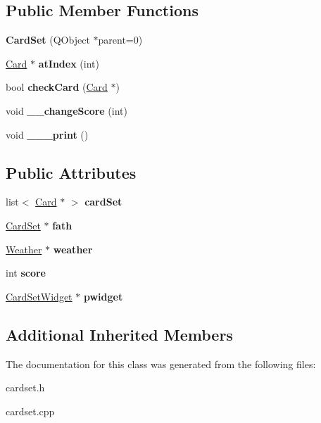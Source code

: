 \subsection*{Public Member Functions}
\begin{DoxyCompactItemize}
\item 
\mbox{\label{class_card_set_ab71f7d1a3ff84bbe38a15a9f3763cc51}} 
{\bfseries Card\+Set} (Q\+Object $\ast$parent=0)
\item 
\mbox{\label{class_card_set_aa1bc47338af30630e2bf531efbe0cf56}} 
\hyperlink{class_card}{Card} $\ast$ {\bfseries at\+Index} (int)
\item 
\mbox{\label{class_card_set_aaeac4f9e1a5560457653f42416721459}} 
bool {\bfseries check\+Card} (\hyperlink{class_card}{Card} $\ast$)
\item 
\mbox{\label{class_card_set_a5869ddf6190c03ce3bc5ce77139708e4}} 
void {\bfseries \+\_\+\+\_\+change\+Score} (int)
\item 
\mbox{\label{class_card_set_ab025d30be863978e10536c97874fbbe5}} 
void {\bfseries \+\_\+\+\_\+\+\_\+print} ()
\end{DoxyCompactItemize}
\subsection*{Public Attributes}
\begin{DoxyCompactItemize}
\item 
\mbox{\label{class_card_set_a1edd225de05154f8feafc2afab4dd22b}} 
list$<$ \hyperlink{class_card}{Card} $\ast$ $>$ {\bfseries card\+Set}
\item 
\mbox{\label{class_card_set_ad216ddc2e60b7e83c8bd3ab35d22cde0}} 
\hyperlink{class_card_set}{Card\+Set} $\ast$ {\bfseries fath}
\item 
\mbox{\label{class_card_set_a04ee7f62a134fee4c15199eec78614d8}} 
\hyperlink{class_weather}{Weather} $\ast$ {\bfseries weather}
\item 
\mbox{\label{class_card_set_aa46653ada53e7a80af71309a8a93cc3e}} 
int {\bfseries score}
\item 
\mbox{\label{class_card_set_ac3e5cdf72e36e2928adef9c7f37f9296}} 
\hyperlink{class_card_set_widget}{Card\+Set\+Widget} $\ast$ {\bfseries pwidget}
\end{DoxyCompactItemize}
\subsection*{Additional Inherited Members}


The documentation for this class was generated from the following files\+:\begin{DoxyCompactItemize}
\item 
cardset.\+h\item 
cardset.\+cpp\end{DoxyCompactItemize}
